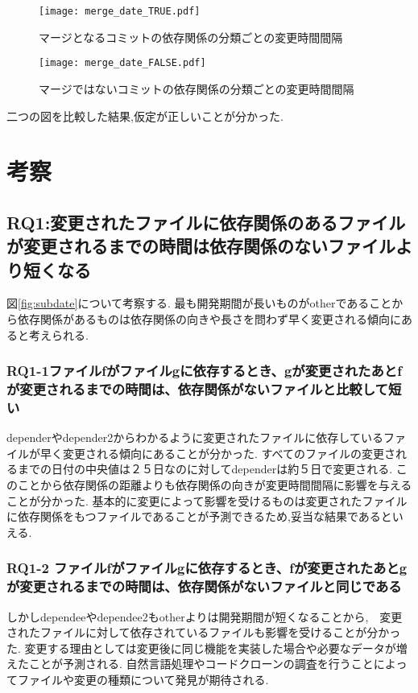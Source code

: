 \documentclass{fose2016}           %
\begin{document}
\begin{figure}
\centering
\begin{minipage}{0.49\columnwidth}
\centering
\texttt{[image: merge\_date\_TRUE.pdf]}
\caption{マージとなるコミットの依存関係の分類ごとの変更時間間隔}
\label{fig:merge_true_subdate} 
\end{minipage}
\begin{minipage}{0.49\columnwidth}
\centering
\texttt{[image: merge\_date\_FALSE.pdf]}
\caption{マージではないコミットの依存関係の分類ごとの変更時間間隔}
\label{fig:merge_false_subdate}
\end{minipage}
\end{figure}
二つの図を比較した結果,仮定が正しいことが分かった.

\section{考察}\label{考察}

\subsection{RQ1:変更されたファイルに依存関係のあるファイルが変更されるまでの時間は依存関係のないファイルより短くなる}
図\ref{fig:subdate}について考察する.
最も開発期間が長いものがotherであることから依存関係があるものは依存関係の向きや長さを問わず早く変更される傾向にあると考えられる.

\subsubsection{RQ1-1ファイルfがファイルgに依存するとき、gが変更されたあとfが変更されるまでの時間は、依存関係がないファイルと比較して短い}
dependerやdepender2からわかるように変更されたファイルに依存しているファイルが早く変更される傾向にあることが分かった.
すべてのファイルの変更されるまでの日付の中央値は２５日なのに対してdependerは約５日で変更される.
このことから依存関係の距離よりも依存関係の向きが変更時間間隔に影響を与えることが分かった.
基本的に変更によって影響を受けるものは変更されたファイルに依存関係をもつファイルであることが予測できるため,妥当な結果であるといえる.

\subsubsection{RQ1-2 ファイルfがファイルgに依存するとき、fが変更されたあとgが変更されるまでの時間は、依存関係がないファイルと同じである}
しかしdependeeやdependee2もotherよりは開発期間が短くなることから,　変更されたファイルに対して依存されているファイルも影響を受けることが分かった.
変更する理由としては変更後に同じ機能を実装した場合や必要なデータが増えたことが予測される.
自然言語処理やコードクローンの調査を行うことによってファイルや変更の種類について発見が期待される.
\end{document}
